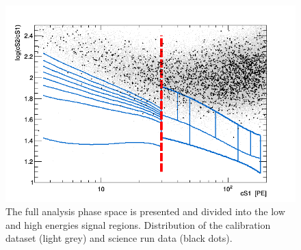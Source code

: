 \begin{table}

\caption{Bins definition. The estimated background event is calculated by taking the calibration sample and scaling it by $6.54e-3$, which is a the ration between data and calibration in a sideband. The number of data events is the number of events from the DM data set in each bin.} \label{table:BinDef}

\end{table}


\begin{figure}[t]
\centerline{\includegraphics[width=1.\linewidth]{Figures/eft_sr.png}}
\caption{The full analysis phase space is presented and divided into the low and high energies signal regions. Distribution of the calibration dataset (light grey) and science run data (black dots). 
}
\label{fig:phasespace}
\end{figure}  


